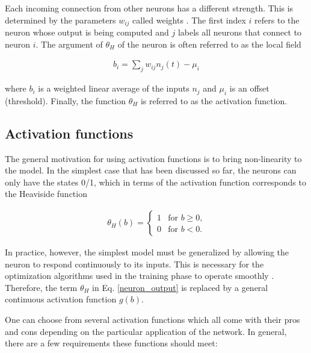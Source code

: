 Each incoming connection from other neurons has a different strength. This is determined by the parameters $ w_{ij} $ called weights . The first index $ i $ refers to the neuron whose output is being computed and $ j $ labels all neurons that connect
to neuron $ i $. The argument of $ \theta_H $ of the neuron is often referred to as the local field \cite{mehlig}

\begin{gather}
\label{local_field}
b_i = \sum\limits_{j}w_{ij}n_j(t) - \mu_i
\end{gather}

\noindent where $ b_i $ is a weighted linear average of the inputs $ n_j $ and $ \mu_i $ is an offset (threshold). Finally, the function $ \theta_H $ is referred to as the activation function. \cite{mehlig}

\subsection{Activation functions}

The general motivation for using activation functions is to bring non-linearity to the model. In the simplest case that has been discussed so far, the neurons can only have the states 0/1, which in terms of the activation function corresponds to the Heaviside function \cite{mehlig}

\begin{gather}
	\theta_H(b) = 
	\begin{cases}	
	1 & \text{for $b \geq 0$,}\\
	0 & \text{for $b < 0$.}
	\end{cases} 
\end{gather}

\noindent In practice, however, the simplest model must be generalized by allowing the neuron to respond continuously to its inputs. This is necessary for the optimization algorithms used in the training phase to operate smoothly \cite{groman}. Therefore, the term $ \theta_H $ in Eq. \eqref{neuron_output} is replaced by a general continuous activation function $ g(b) $. \cite{mehlig}

\newpage

One can choose from several activation functions which all come with their pros and cons depending on the particular application of the network. In general, there are a few requirements these functions should meet: \cite{groman}

